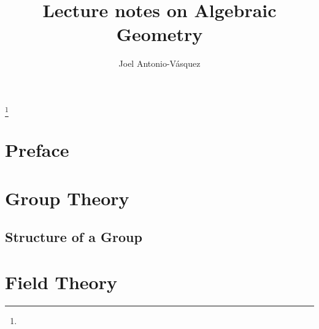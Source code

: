 \documentclass[10pt]{amsbook}%
\theoremstyle{plain}
\theoremstyle{definition}
\numberwithin{equation}{section}
\begin{document}
\frontmatter
\title[notes]{Lecture notes on Algebraic Geometry}
\author[Joel Antonio-V\'asquez]{Joel Antonio-V\'asquez}
\address{Ica, Peru}
\thanks{}%
\subjclass{}%

\begin{abstract}
\end{abstract}
\maketitle
\tableofcontents


\chapter*{Preface}

%

\mainmatter


\chapter{Group Theory}

\section{Structure of a Group}
  
\chapter{Field Theory}

%
%
%
%
%
\end{document}
